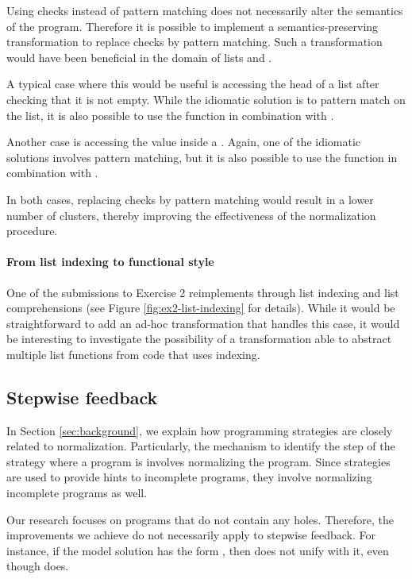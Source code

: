 Using checks instead of pattern matching does not necessarily alter the semantics of the program. Therefore it is possible to implement a semantics-preserving transformation to replace checks by pattern matching. Such a transformation would have been beneficial in the domain of lists and .

A typical case where this would be useful is accessing the head of a list after checking that it is not empty. While the idiomatic solution is to pattern match on the list, it is also possible to use the  function in combination with .

Another case is accessing the value inside a . Again, one of the idiomatic solutions involves pattern matching, but it is also possible to use  the  function in combination with .

In both cases, replacing checks by pattern matching would result in a lower number of clusters, thereby improving the effectiveness of the normalization procedure.

\paragraph{From list indexing to functional style}

One of the submissions to Exercise 2 reimplements  through list indexing and list comprehensions (see Figure \ref{fig:ex2-list-indexing} for details). While it would be straightforward to add an ad-hoc transformation that handles this case, it would be interesting to investigate the possibility of a transformation able to abstract multiple list functions from code that uses indexing.

\subsection{Stepwise feedback}

In Section \ref{sec:background}, we explain how programming strategies are closely related to normalization. Particularly, the mechanism to identify the step of the strategy where a program is involves normalizing the program. Since strategies are used to provide hints to incomplete programs, they involve normalizing incomplete programs as well.

Our research focuses on programs that do not contain any holes. Therefore, the improvements we achieve do not necessarily apply to stepwise feedback. For instance, if the model solution has the form , then  does not unify with it, even though  does.


